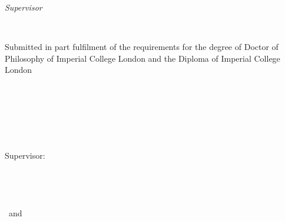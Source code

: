 \begin{titlepage}
	\vfill
	\begin{minipage}[t]{.27\textwidth}
		\raggedleft
		\textit{Supervisor}
	\end{minipage}
	\hspace*{15pt}
	\begin{minipage}[t]{.65\textwidth}
		\thesisFirstSupervisor%
	\end{minipage} \\[10mm]
    \begin{minipage}[t]{.8\textwidth}
        {\small
            Submitted in part fulfilment of the requirements for the degree of
            Doctor of Philosophy of Imperial College London and the Diploma of
            Imperial College London
        }
    \end{minipage} \\[10mm]

	\thesisDate \\

\end{titlepage}


\hfill
\vfill
{
	\small
	\textbf{\thesisName} \\
	\textit{\thesisTitle} \\
	\thesisDate \\
	Supervisor: \thesisFirstSupervisor%
	\\[1.5em]
    \textbf{\thesisUniversity} \\
	\textit{\thesisUniversityGroup} \\
	\thesisUniversityDepartment \\
	\thesisUniversityStreetAddress \\
	\thesisUniversityPostalCode\ and \thesisUniversityCity
}
